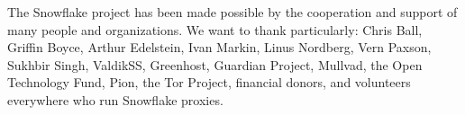 \documentclass[letterpaper,twocolumn]{article}
\begin{document}
The Snowflake project has been made possible
by the cooperation and support of many people
and organizations.
We want to thank particularly:
Chris Ball, %
Griffin Boyce, %
Arthur Edelstein, %
Ivan Markin, %
Linus Nordberg, %
Vern Paxson, %
Sukhbir Singh, %
ValdikSS, %
Greenhost, %
Guardian Project, %
Mullvad, %
the Open Technology Fund, %
Pion,
the Tor Project,
financial donors,
and volunteers everywhere who run Snowflake proxies.



\end{document}

